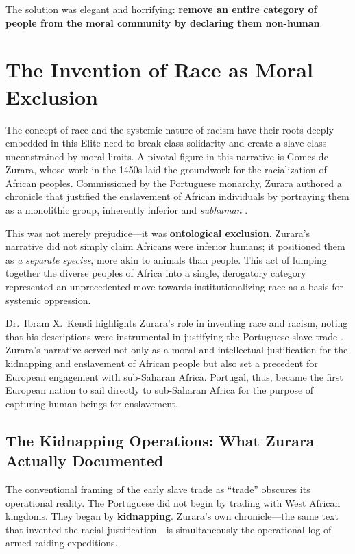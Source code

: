 \documentclass[12pt,openany]{book}
\begin{document}
The solution was elegant and horrifying: \textbf{remove an entire category of people from the moral community by declaring them non-human}.
\section{The Invention of Race as Moral Exclusion}

The concept of race and the systemic nature of racism have their roots deeply embedded in this Elite need to break class solidarity and create a slave class unconstrained by moral limits. A pivotal figure in this narrative is Gomes de Zurara, whose work in the 1450s laid the groundwork for the racialization of African peoples. Commissioned by the Portuguese monarchy, Zurara authored a chronicle that justified the enslavement of African individuals by portraying them as a monolithic group, inherently inferior and \textit{subhuman} \cite{zurara, kendi}. 

This was not merely prejudice---it was \textbf{ontological exclusion}. Zurara's narrative did not simply claim Africans were inferior humans; it positioned them as \textit{a separate species}, more akin to animals than people. This act of lumping together the diverse peoples of Africa into a single, derogatory category represented an unprecedented move towards institutionalizing race as a basis for systemic oppression.

Dr.\ Ibram X.\ Kendi highlights Zurara's role in inventing race and racism, noting that his descriptions were instrumental in justifying the Portuguese slave trade \cite{kendi}. Zurara's narrative served not only as a moral and intellectual justification for the kidnapping and enslavement of African people but also set a precedent for European engagement with sub-Saharan Africa. Portugal, thus, became the first European nation to sail directly to sub-Saharan Africa for the purpose of capturing human beings for enslavement.

\subsection{The Kidnapping Operations: What Zurara Actually Documented}

The conventional framing of the early slave trade as ``trade'' obscures its operational reality. The Portuguese did not begin by trading with West African kingdoms. They began by \textbf{kidnapping}. Zurara's own chronicle---the same text that invented the racial justification---is simultaneously the operational log of armed raiding expeditions.
\end{document}
